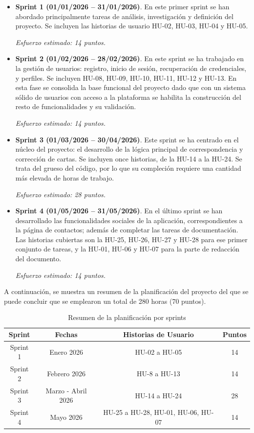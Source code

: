 \begin{itemize}

\item \textbf{Sprint 1 (01/01/2026 – 31/01/2026)}.
En este primer sprint se han abordado principalmente tareas de análisis, investigación y definición del proyecto. Se incluyen las historias de usuario HU-02, HU-03, HU-04 y HU-05.

\textit{Esfuerzo estimado: 14 puntos.}

\item \textbf{Sprint 2 (01/02/2026 – 28/02/2026)}.
En este sprint se ha trabajado en la gestión de usuarios: registro, inicio de sesión, recuperación de credenciales, y perfiles. Se incluyen HU-08, HU-09, HU-10, HU-11, HU-12 y HU-13. En esta fase se consolida la base funcional del proyecto dado que con un sistema sólido de usuarios con acceso a la plataforma se habilita la construcción del resto de funcionalidades y su validación.

\textit{Esfuerzo estimado: 14 puntos.}

\item \textbf{Sprint 3 (01/03/2026 – 30/04/2026)}.
Este sprint se ha centrado en el núcleo del proyecto: el desarrollo de la lógica principal de correspondencia y corrección de cartas. Se incluyen once historias, de la HU-14 a la HU-24. Se trata del grueso del código, por lo que su compleción requiere una cantidad más elevada de horas de trabajo.

\textit{Esfuerzo estimado: 28 puntos.}

\item \textbf{Sprint 4 (01/05/2026 – 31/05/2026)}.
En el último sprint se han desarrollado las funcionalidades sociales de la aplicación, correspondientes a la página de contactos; además de completar las tareas de documentación. Las historias cubiertas son la HU-25, HU-26, HU-27 y HU-28 para ese primer conjunto de tareas, y la HU-01, HU-06 y HU-07 para la parte de redacción del documento.

\textit{Esfuerzo estimado: 14 puntos.}

\end{itemize}



A continuación, se muestra un resumen de la planificación del proyecto del que se puede concluir que se emplearon un total de 280 horas (70 puntos).

\begin{table}[H]
\centering
\begin{tabular}{|c|c|c|c|}
\hline
\textbf{Sprint} & \textbf{Fechas} & \textbf{Historias de Usuario} & \textbf{Puntos} \\
\hline
Sprint 1 & Enero 2026 & HU-02 a HU-05 & 14 \\
\hline
Sprint 2 & Febrero 2026 & HU-8 a HU-13 & 14 \\
\hline
Sprint 3 & Marzo - Abril 2026 & HU-14 a HU-24 & 28 \\
\hline
Sprint 4 & Mayo 2026 & HU-25 a HU-28, HU-01, HU-06, HU-07 & 14 \\
\hline
\end{tabular}
\caption{Resumen de la planificación por sprints}
\end{table}



